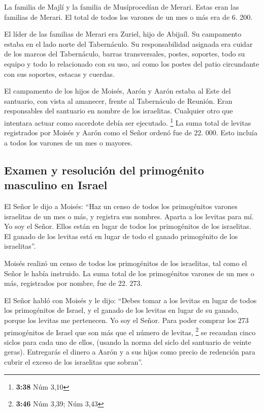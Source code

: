  La familia de Majlí y la familia de Musíprocedían de
Merari. Estas eran las familias de Merari.  El total de
todos los varones de un mes o más era de 6. 200.

 El líder de las familias de Merari era Zuriel, hijo de
Abijaíl. Su campamento estaba en el lado norte del Tabernáculo.
 Su responsabilidad asignada era cuidar de los marcos del
Tabernáculo, barras transversales, postes, soportes, todo su equipo y
todo lo relacionado con su uso,  así como los postes del
patio circundante con sus soportes, estacas y cuerdas.

 El campamento de los hijos de Moisés, Aarón y Aarón
estaba al Este del santuario, con vista al amanecer, frente al
Tabernáculo de Reunión. Eran responsables del santuario en nombre de los
israelitas. Cualquier otro que intentara actuar como sacerdote debía ser
ejecutado. \footnote{\textbf{3:38} Núm 3,10}  La suma
total de levitas registrados por Moisés y Aarón como el Señor ordenó fue
de 22. 000. Esto incluía a todos los varones de un mes o mayores.

\hypertarget{examen-y-resoluciuxf3n-del-primoguxe9nito-masculino-en-israel}{%
\subsection{Examen y resolución del primogénito masculino en
Israel}\label{examen-y-resoluciuxf3n-del-primoguxe9nito-masculino-en-israel}}

 El Señor le dijo a Moisés: ``Haz un censo de todos los
primogénitos varones israelitas de un mes o más, y registra sus nombres.
 Aparta a los levitas para mí. Yo soy el Señor. Ellos
están en lugar de todos los primogénitos de los israelitas. El ganado de
los levitas está en lugar de todo el ganado primogénito de los
israelitas''.

 Moisés realizó un censo de todos los primogénitos de los
israelitas, tal como el Señor le había instruido.  La
suma total de los primogénitos varones de un mes o más, registrados por
nombre, fue de 22. 273.

 El Señor habló con Moisés y le dijo: 
``Debes tomar a los levitas en lugar de todos los primogénitos de
Israel, y el ganado de los levitas en lugar de su ganado, porque los
levitas me pertenecen. Yo soy el Señor.  Para poder
comprar los 273 primogénitos de Israel que son más que el número de
levitas, \footnote{\textbf{3:46} Núm 3,39; Núm 3,43}  se
recaudan cinco siclos para cada uno de ellos, (usando la norma del siclo
del santuario de veinte geras).  Entregarás el dinero a
Aarón y a sus hijos como precio de redención para cubrir el exceso de
los israelitas que sobran''.


